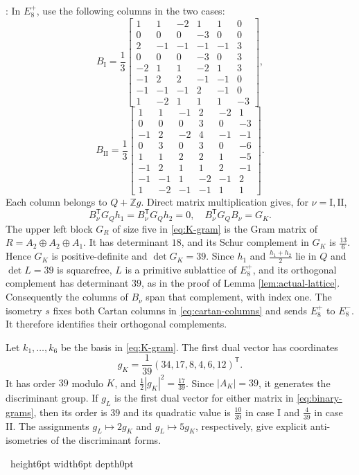 \documentclass[leqno]{article}
\newcommand{\Z}{\ensuremath{\mathbb{Z}}}
\newcommand{\qed}{\hfill \vrule height6pt  width6pt depth0pt}
\newenvironment{proof}[1][]{\noindent {\it Proof #1} : }{\hbox{~}\qed
\smallskip
}
\numberwithin{equation}{section}
\begin{document}
\begin{proof}
In $E_8^+$, use the following columns in the two cases:
\begin{equation}
\label{eq:K-basis-I}
B_{\mathrm I} = \frac13
\begin{bmatrix}
1&1&-2&1&1&0\\
0&0&0&-3&0&0\\
2&-1&-1&-1&-1&3\\
0&0&0&-3&0&3\\
-2&1&1&-2&1&3\\
-1&2&2&-1&-1&0\\
-1&-1&-1&2&-1&0\\
1&-2&1&1&1&-3
\end{bmatrix},
\end{equation}
\begin{equation}
\label{eq:K-basis-II}
B_{\mathrm {II}} = \frac13
\begin{bmatrix}
1&1&-1&2&-2&1\\
0&0&0&3&0&-3\\
-1&2&-2&4&-1&-1\\
0&3&0&3&0&-6\\
1&1&2&2&1&-5\\
-1&2&1&1&2&-1\\
-1&-1&1&-2&-1&2\\
1&-2&-1&-1&1&1
\end{bmatrix}.
\end{equation}
Each column belongs to $Q+\Z g$. Direct matrix multiplication gives, for $\nu = \mathrm I,\mathrm {II}$,
\begin{equation}
\label{eq:K-matrix-check}
B_\nu^\mathsf T G_Q h_1 = B_\nu^\mathsf T G_Q h_2 = 0,
\quad B_\nu^\mathsf T G_Q B_\nu = G_K.
\end{equation}
The upper left block $G_R$ of size five in \eqref{eq:K-gram} is the Gram matrix of $R = A_2 \oplus A_2 \oplus A_1$. It has determinant $18$, and its Schur complement in $G_K$ is $\frac{13}{6}$. Hence $G_K$ is positive-definite and $\det G_K = 39$. Since $h_1$ and $\frac{h_1+h_2}{2}$ lie in $Q$ and $\det L = 39$ is squarefree, $L$ is a primitive sublattice of $E_8^+$, and its orthogonal complement has determinant $39$, as in the proof of Lemma \ref{lem:actual-lattice}. Consequently the columns of $B_\nu$ span that complement, with index one. The isometry $s$ fixes both Cartan columns in \eqref{eq:cartan-columns} and sends $E_8^+$ to $E_8^-$. It therefore identifies their orthogonal complements.

Let $k_1,\ldots,k_6$ be the basis in \eqref{eq:K-gram}. The first dual vector has coordinates
\[
g_K = \frac1{39}(34,17,8,4,6,12)^\mathsf T.
\]
It has order $39$ modulo $K$, and $\frac{1}{2}|g_K|^2 = \frac{17}{39}$. Since $|A_K| = 39$, it generates the discriminant group. If $g_L$ is the first dual vector for either matrix in \eqref{eq:binary-grams}, then its order is $39$ and its quadratic value is $\frac{10}{39}$ in case I and $\frac{4}{39}$ in case II. The assignments $g_L \mapsto 2g_K$ and $g_L \mapsto 5g_K$, respectively, give explicit anti-isometries of the discriminant forms.


\end{proof}
\end{document}
